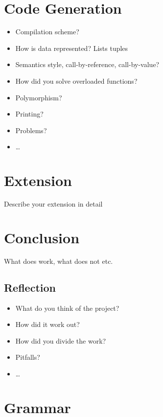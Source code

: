 \documentclass{report}
\begin{document}
\chapter{Code Generation}
\begin{itemize}
	\item Compilation scheme?
	\item How is data represented? Lists tuples
	\item Semantics style, call-by-reference, call-by-value?
	\item How did you solve overloaded functions?
	\item Polymorphism?
	\item Printing?
	\item Problems?
	\item\ldots
\end{itemize}

\chapter{Extension}
Describe your extension in detail

\chapter{Conclusion}
What does work, what does not etc.

\section{Reflection}
\begin{itemize}
	\item What do you think of the project?
	\item How did it work out?
	\item How did you divide the work?
	\item Pitfalls?
	\item \ldots
\end{itemize}

\appendix
\chapter{Grammar}
\end{document}
